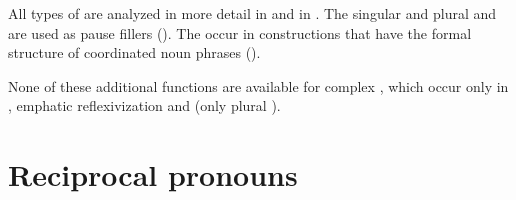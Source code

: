 All types of  are analyzed in more detail in  and in \citet{Forker2014}. The  singular and plural   and  are used as pause fillers (). The   occur in  constructions that have the formal structure of coordinated noun phrases ().

None of these additional functions are available for complex , which occur only in , emphatic reflexivization and  (only plural ).



\section{Reciprocal pronouns}
\label{sec:Reciprocal pronouns}

